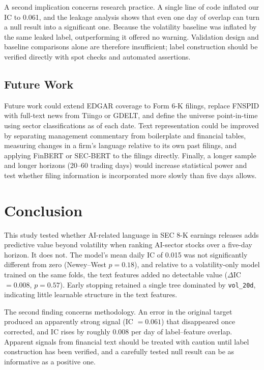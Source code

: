 \documentclass[10pt,letterpaper,twocolumn]{article}
\begin{document}
A second implication concerns research practice. A single line of code inflated our IC to 0.061, and the leakage analysis shows that even one day of overlap can turn a null result into a significant one. Because the volatility baseline was inflated by the same leaked label, outperforming it offered no warning. Validation design and baseline comparisons alone are therefore insufficient; label construction should be verified directly with spot checks and automated assertions.

\subsection{Future Work}
Future work could extend EDGAR coverage to Form 6-K filings, replace FNSPID with full-text news from Tiingo or GDELT, and define the universe point-in-time using sector classifications as of each date. Text representation could be improved by separating management commentary from boilerplate and financial tables, measuring changes in a firm's language relative to its own past filings, and applying FinBERT or SEC-BERT \cite{loukas-etal-2022-finer} to the filings directly. Finally, a longer sample and longer horizons (20--60 trading days) would increase statistical power and test whether filing information is incorporated more slowly than five days allows.

\section{Conclusion}
This study tested whether AI-related language in SEC 8-K earnings releases adds predictive value beyond volatility when ranking AI-sector stocks over a five-day horizon. It does not. The model's mean daily IC of 0.015 was not significantly different from zero (Newey--West $p = 0.18$), and relative to a volatility-only model trained on the same folds, the text features added no detectable value ($\Delta$IC $= 0.008$, $p = 0.57$). Early stopping retained a single tree dominated by \texttt{vol\_20d}, indicating little learnable structure in the text features.

The second finding concerns methodology. An error in the original target produced an apparently strong signal (IC $= 0.061$) that disappeared once corrected, and IC rises by roughly 0.008 per day of label--feature overlap. Apparent signals from financial text should be treated with caution until label construction has been verified, and a carefully tested null result can be as informative as a positive one.
\end{document}
